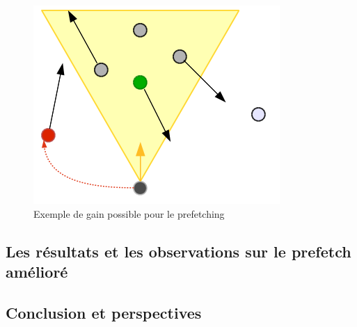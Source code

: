 	\begin{figure}[!h]
        \centering
        \includegraphics[scale=0.45]{./Ressources/Images/prefetchav.png}
        \caption{Exemple de gain possible pour le prefetching}
        \label{prefetchav}
        \end{figure}

\subsection{Les résultats et les observations sur le prefetch amélioré}



\subsection{Conclusion et perspectives}



\newpage
